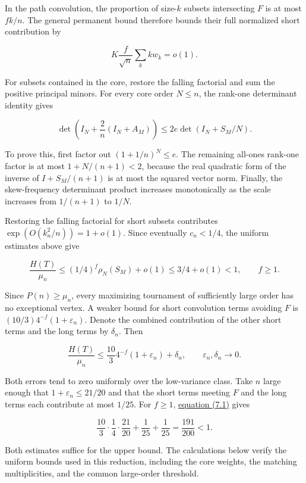 \documentclass[11pt,a4paper]{article}
\begin{document}
In the path convolution, the proportion of size-\(k\) subsets intersecting \(F\) is at most \(fk/n\). The general permanent bound therefore bounds their full normalized short contribution by

\[
K\frac f{\sqrt n}\sum_k kw_k=o(1).
\]

For subsets contained in the core, restore the falling factorial and sum the positive principal minors. For every core order \(N\le n\), the rank-one determinant identity gives

\[
\det\left(I_N+\frac2n(I_N+A_M)\right)
\le2e\det(I_N+S_M/N).
\]

To prove this, first factor out \((1+1/n)^N\le e\). The remaining all-ones rank-one factor is at most \(1+N/(n+1)<2\), because the real quadratic form of the inverse of \(I+S_M/(n+1)\) is at most the squared vector norm. Finally, the skew-frequency determinant product increases monotonically as the scale increases from \(1/(n+1)\) to \(1/N\).

Restoring the falling factorial for short subsets contributes \(\exp(O(k_n^2/n))=1+o(1)\). Since eventually \(c_n<1/4\), the uniform estimates above give

\[
\frac{H(T)}{\mu_n}
\le(1/4)^f\rho_N(S_M)+o(1)
\le 3/4+o(1)<1,\qquad f\ge1.
\]

Since \(P(n)\ge\mu_n\), every maximizing tournament of sufficiently large order has no exceptional vertex. A weaker bound for short convolution terms avoiding \(F\) is \((10/3)4^{-f}(1+\varepsilon_n)\). Denote the combined contribution of the other short terms and the long terms by \(\delta_n\). Then

\begin{equation}
\frac{H(T)}{\mu_n}\le\frac{10}{3}4^{-f}(1+\varepsilon_n)+\delta_n,
\qquad \varepsilon_n,\delta_n\longrightarrow0.
\tag{7.1}
\label{eq-exceptional-bound}
\end{equation}

Both errors tend to zero uniformly over the low-variance class. Take \(n\) large enough that \(1+\varepsilon_n\le21/20\) and that the short terms meeting \(F\) and the long terms each contribute at most \(1/25\). For \(f\ge1\), \hyperref[eq-exceptional-bound]{equation (7.1)} gives

\[
\frac{10}{3}\cdot\frac14\cdot\frac{21}{20}+\frac1{25}+\frac1{25}
=\frac{191}{200}<1.
\]

Both estimates suffice for the upper bound. The calculations below verify the uniform bounds used in this reduction, including the core weights, the matching multiplicities, and the common large-order threshold.
\end{document}
